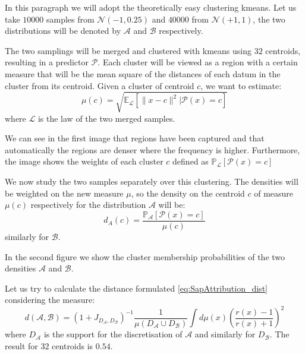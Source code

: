 \begin{toReview}
\begin{exempli_gratia}
	In this paragraph we will adopt the theoretically easy clustering \gls{kmeans}. Let us take $\num{10000}$ samples from $\mathcal{N}(-1,0.25)$ and $\num{40000}$ from $\mathcal{N}(+1,1)$, the two distributions will be denoted by $\mathcal{A}$ and $\mathcal{B}$ respectively.

	\noindent The two samplings will be merged and clustered with \gls{kmeans} using $32$ centroids, resulting in a predictor $\mathcal{P}$. Each cluster will be viewed as a region with a certain measure that will be the mean square of the distances of each datum in the cluster from its centroid. Given a cluster of centroid $c$, we want to estimate:
	\[
	\mu(c)=\sqrt{\mathbb{E}_\mathcal{L}\left[\|x-c\|^2|\mathcal{P}\left(x\right)=c\right]}
	\]
	where $\mathcal{L}$ is the law of the two merged samples.

	\noindent We can see in the first image that regions have been captured and that automatically the regions are denser where the frequency is higher. Furthermore, the image shows the weights of each cluster $c$ defined as  $\mathbb{P}_\mathcal{L}\left[\mathcal{P}(x)=c\right]$

	\noindent We now study the two samples separately over this clustering. The densities will be weighted on the new measure $\mu$, so the density on the centroid $c$ of measure $\mu(c)$ respectively for the distribution $\mathcal{A}$ will be:
	\[
	d_A(c)=\frac{\mathbb{P}_{\mathcal{A}}\left[\mathcal{P}(x)=c\right]}{\mu(c)}
	\]
	similarly for $\mathcal{B}$.

	\noindent In the second figure we show the cluster membership probabilities of the two densities $\mathcal{A}$ and $\mathcal{B}$.

	\noindent Let us try to calculate the distance formulated \cref{eq:SapAttribution_dist} considering the measure:
	\[
	d(\mathcal{A},\mathcal{B})=(1+J_{D_\mathcal{A},D_\mathcal{B}})^{-1}\frac{1}{\mu(D_\mathcal{A}\cup D_\mathcal{B})}\int d\mu(x) \left(\frac{r(x)-1}{r(x)+1}\right)^2
	\]
	where $D_{\mathcal{A}}$ is the support for the discretisation of ${\mathcal{A}}$ and similarly for $D_{\mathcal{B}}$. The result for $32$ centroids is $0.54$.


\end{exempli_gratia}
\end{toReview}
